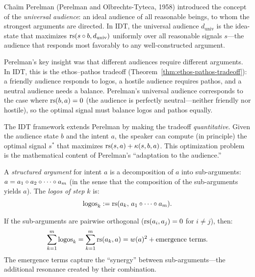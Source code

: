 \begin{remark}
\label{rem:perelman}
Chaïm Perelman (Perelman and Olbrechts-Tyteca, 1958) introduced the concept
of the \emph{universal audience}: an ideal audience of all reasonable beings,
to whom the strongest arguments are directed.  In IDT, the universal audience
$d_{\text{univ}}$ is the idea-state that maximizes $\mathrm{rs}(s \circ b,
d_{\text{univ}})$ uniformly over all reasonable signals $s$---the audience
that responds most favorably to any well-constructed argument.

Perelman's key insight was that different audiences require different
arguments.  In IDT, this is the ethos--pathos tradeoff
(Theorem~\ref{thm:ethos-pathos-tradeoff}): a friendly audience responds
to logos, a hostile audience requires pathos, and a neutral audience needs
a balance.  Perelman's universal audience corresponds to the case where
$\mathrm{rs}(b, a) = 0$ (the audience is perfectly neutral---neither friendly
nor hostile), so the optimal signal must balance logos and pathos equally.

The IDT framework extends Perelman by making the tradeoff \emph{quantitative}.
Given the audience state $b$ and the intent $a$, the speaker can compute
(in principle) the optimal signal $s^*$ that maximizes
$\mathrm{rs}(s, a) + \kappa(s, b, a)$.  This optimization problem is the
mathematical content of Perelman's ``adaptation to the audience.''
\end{remark}

\begin{definition}
\label{def:argument-decomposition}
A \emph{structured argument} for intent $a$ is a decomposition of $a$ into
sub-arguments: $a = a_1 \circ a_2 \circ \cdots \circ a_m$ (in the
sense that the composition of the sub-arguments yields $a$).  The
\emph{logos of step $k$} is:
\[
  \text{logos}_k := \mathrm{rs}(a_k,\, a_1 \circ \cdots \circ a_m).
\]
\end{definition}

\begin{theorem}
\label{thm:logos-additivity}
If the sub-arguments are pairwise orthogonal ($\mathrm{rs}(a_i, a_j) = 0$ for
$i \neq j$), then:
\[
  \sum_{k=1}^m \text{logos}_k = \sum_{k=1}^m \mathrm{rs}(a_k, a)
  = w(a)^2 + \text{emergence terms}.
\]
The emergence terms capture the ``synergy'' between sub-arguments---the
additional resonance created by their combination.
\end{theorem}

